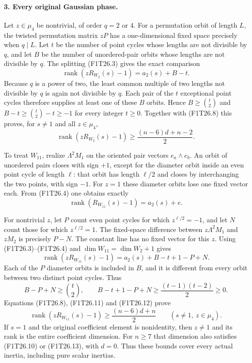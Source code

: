 \paragraph{3. Every original Gaussian phase.}
Let $z\in\mu_4$ be nontrivial, of order $q=2$ or $4$.
For a permutation orbit of length $L$, the twisted
permutation matrix $zP$ has a one-dimensional fixed
space precisely when $q\mid L$. Let $t$ be the number
of point cycles whose lengths are not divisible by $q$,
and let $B$ be the number of unordered-pair orbits whose
lengths are not divisible by $q$. The splitting
(F1T26.3) gives the exact comparison
\[
          \operatorname{rank}(zR_{W_2}(s)-1)
                         =a_2(s)+B-t.
 \tag{F1T26.9}
\]
Because $q$ is a power of two, the least common multiple
of two lengths not divisible by $q$ is again not divisible
by $q$. Each pair of the $t$ exceptional point cycles
therefore supplies at least one of these $B$ orbits.
Hence $B\ge\binom t2$ and
$B-t\ge\binom t2-t\ge-1$ for every integer $t\ge0$.
Together with (F1T26.8) this proves, for $s\ne1$ and
all $z\in\mu_4$,
\[
 \operatorname{rank}(zR_{W_2}(s)-1)
                    \ge\frac{(n-6)d+n-2}{2}.
 \tag{F1T26.10}
\]

To treat $W_{11}$, realize $\Lambda^2M_1$ on the
oriented pair vectors $e_a\wedge e_b$. An orbit of
unordered pairs closes with sign $+1$, except for the
diameter orbit inside an even point cycle of length
$\ell$: that orbit has length $\ell/2$ and closes
by interchanging the two points, with sign $-1$.
For $z=1$ these diameter orbits lose one fixed vector
each. From (F1T26.4) one obtains exactly
\[
             \operatorname{rank}(R_{W_{11}}(s)-1)
                                      =a_2(s)+e.
 \tag{F1T26.11}
\]

For nontrivial $z$, let $P$ count even point cycles for
which $z^{\ell/2}=-1$, and let $N$ count those for
which $z^{\ell/2}=1$. The fixed-space difference between
$z\Lambda^2M_1$ and $zM_2$ is precisely $P-N$.
The constant line has no fixed vector for this $z$.
Using (F1T26.3)--(F1T26.4) and
$\dim W_{11}=\dim W_2+1$ gives
\[
 \operatorname{rank}(zR_{W_{11}}(s)-1)
                     =a_2(s)+B-t+1-P+N.
 \tag{F1T26.12}
\]
Each of the $P$ diameter orbits is included in $B$,
and it is different from every orbit between two
distinct point cycles. Thus
\[
 B-P+N\ge\binom t2,\qquad
 B-t+1-P+N\ge\frac{(t-1)(t-2)}2\ge0.
\]
Equations (F1T26.8), (F1T26.11) and (F1T26.12) prove
\[
 \operatorname{rank}(zR_{W_{11}}(s)-1)
                     \ge\frac{(n-6)d+n}{2}
                 \qquad(s\ne1,\ z\in\mu_4).
 \tag{F1T26.13}
\]
If $s=1$ and the original coefficient element is
nonidentity, then $z\ne1$ and its rank is the entire
coefficient dimension. For $n\ge7$ that dimension
also satisfies (F1T26.10) or (F1T26.13), with $d=0$.
Thus these bounds cover every actual inertia, including
pure scalar inertias.

